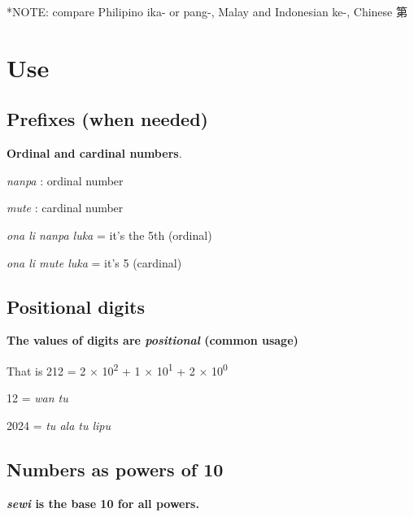 \documentclass{article}
\begin{document}
\vspace{5pt}	

	*NOTE: compare Philipino ika- or pang-, Malay and Indonesian ke-, Chinese 第

\newpage



\section{Use}
	
\subsection{Prefixes (when needed)}

    \textbf{Ordinal and cardinal numbers}.
	
	\textit{nanpa} {}:  ordinal number
	
	\textit{mute} {}: cardinal number
	
	\vspace{5 pt}
	
	\textit{ona li nanpa luka} = it's the 5th (ordinal)
	
	\textit{ona li mute luka} = it's 5 (cardinal) 
	
	
\subsection{Positional digits}
	
	\textbf{The values of digits are \emph{positional} (common usage)}

	\vspace{5 pt}
		
    That is 212 = 2 × 10\textsuperscript{2} + 1 × 10\textsuperscript{1} + 2 × 10\textsuperscript{0}
	
	\vspace{5 pt}
	
	12 = \emph{wan tu}
	
	2024 = \emph{tu ala tu lipu}
	
\subsection{Numbers as powers of 10}
    
   \textbf{ \textit{sewi} is the base 10 for all powers.}
    
    \vspace{5 pt}
	
\end{document}
